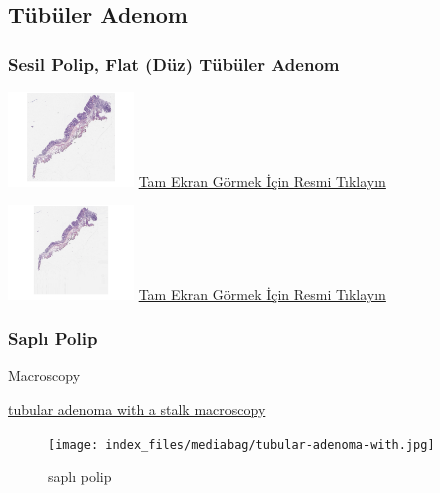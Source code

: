 \documentclass[
  letterpaper,
  paper=6in:9in,
  pagesize=pdftex,
  headinclude=on,
  footinclude=on,
  12pt]{scrbook}
\begin{document}
\hypertarget{sec-kolon-tubuler-adenom}{%
\subsection{Tübüler Adenom}\label{sec-kolon-tubuler-adenom}}

\hypertarget{sec-kolon-sesil-polip}{%
\subsubsection{Sesil Polip, Flat (Düz) Tübüler
Adenom}\label{sec-kolon-sesil-polip}}

\href{https://images.patolojiatlasi.com/tubularadenoma-flat/HE.html}{\includegraphics[width=0.25\textwidth,height=\textheight]{./screenshots/tubularadenoma-flat1_screenshot.png}}
\href{https://images.patolojiatlasi.com/tubularadenoma-flat/HE.html}{Tam
Ekran Görmek İçin Resmi Tıklayın}

\href{https://images.patolojiatlasi.com/tubularadenoma-flat/HE2.html}{\includegraphics[width=0.25\textwidth,height=\textheight]{./screenshots/tubularadenoma-flat2_screenshot.png}}
\href{https://images.patolojiatlasi.com/tubularadenoma-flat/HE2.html}{Tam
Ekran Görmek İçin Resmi Tıklayın}

\hypertarget{sec-kolon-sapli-polip}{%
\subsubsection{Saplı Polip}\label{sec-kolon-sapli-polip}}

Macroscopy

\href{https://images.patolojiatlasi.com/tubularadenoma/tubular-adenoma-with-stalk-macroscopy.jpg}{tubular
adenoma with a stalk macroscopy}

\begin{figure}[H]

{\centering \texttt{[image: index\_files/mediabag/tubular-adenoma-with.jpg]}

}

\caption{saplı polip}

\end{figure}
\end{document}
